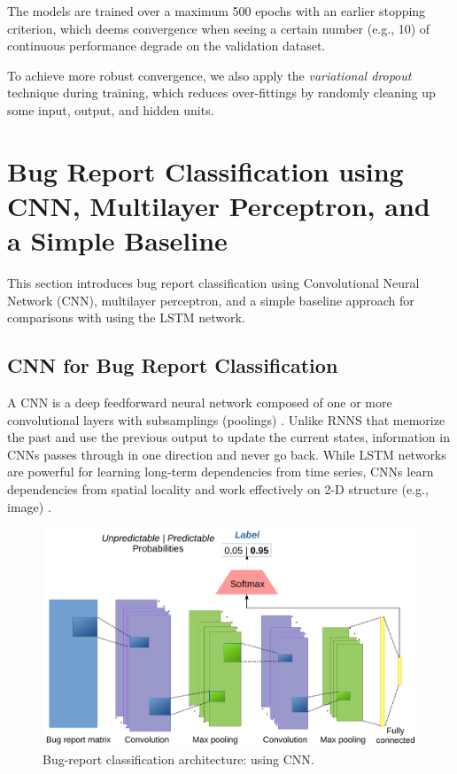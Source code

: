 The models are trained over a maximum 500 epochs with an earlier stopping criterion, which deems convergence when seeing a certain number (e.g., 10) of continuous performance degrade on the validation dataset.

To achieve more robust convergence, we also apply the \textit{variational dropout} technique \cite{Gal:2016:TGA:3157096.3157211} during training, which reduces over-fittings by randomly cleaning up some input, output, and hidden units.

\section{Bug Report Classification using CNN, Multilayer Perceptron, and a Simple Baseline}
\label{sec:cnn perceptron simple baseline}
This section introduces bug report classification using Convolutional Neural Network (CNN), multilayer perceptron, and a simple baseline approach for comparisons with using the LSTM network.

\subsection{CNN for Bug Report Classification}
\label{sec:cnn}
A CNN is a deep feedforward neural network composed of one or more convolutional layers with subsamplings (poolings) \cite{726791}. Unlike RNNS that memorize the past and use the previous output to update the current states, information in CNNs passes through in one direction and never go back. While LSTM networks are powerful for learning long-term dependencies from time series, CNNs learn dependencies from spatial locality and work effectively on 2-D structure (e.g., image) \cite{2014arXiv1409.0575R}.

\begin{figure}[t]
\centering
\includegraphics[width=\columnwidth]{figures/cnn.pdf}
\caption{Bug-report classification architecture: using CNN.}
\label{fig:cnn}
\end{figure}

